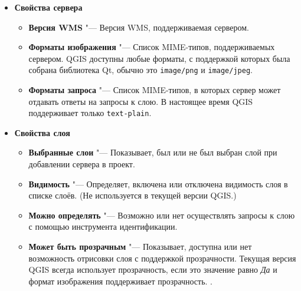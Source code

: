 \begin{itemize}[label=--]
\item \textbf{Свойства сервера}

\begin{itemize}[label=--]
\item \textbf{Версия WMS}          "--- Версия WMS, поддерживаемая сервером.

\item \textbf{Форматы изображения} "--- Список MIME-типов, поддерживаемых
                                       сервером. QGIS доступны любые форматы, с
                                       поддержкой которых была собрана
                                       библиотека Qt, обычно это
                                       \texttt{image/png} и \texttt{image/jpeg}.

\item \textbf{Форматы запроса}     "--- Список MIME-типов, в которых сервер может
                                       отдавать ответы на запросы к слою. В
                                       настоящее время QGIS поддерживает только
                                       \texttt{text-plain}.

\end{itemize}

\item \textbf{Свойства слоя}

\begin{itemize}[label=--]
\item \textbf{Выбранные слои}        "--- Показывает, был или не был выбран слой
                                         при добавлении сервера в проект.

\item \textbf{Видимость}             "--- Определяет, включена или отключена
                                         видимость слоя в списке слоёв. (Не
                                         используется в текущей версии QGIS.)

\item \textbf{Можно определять}      "--- Возможно или нет осуществлять
                                         запросы к слою с помощью инструмента
                                         идентификации.

\item \textbf{Может быть прозрачным} "--- Показывает, доступна или нет
                                         возможность отрисовки слоя с
                                         поддержкой прозрачности. Текущая версия
                                         QGIS всегда использует прозрачность,
                                         если это значение равно \textsl{Да} и
                                         формат изображения поддерживает
                                         прозрачность.
                                    .


\end{itemize}
\end{itemize}
